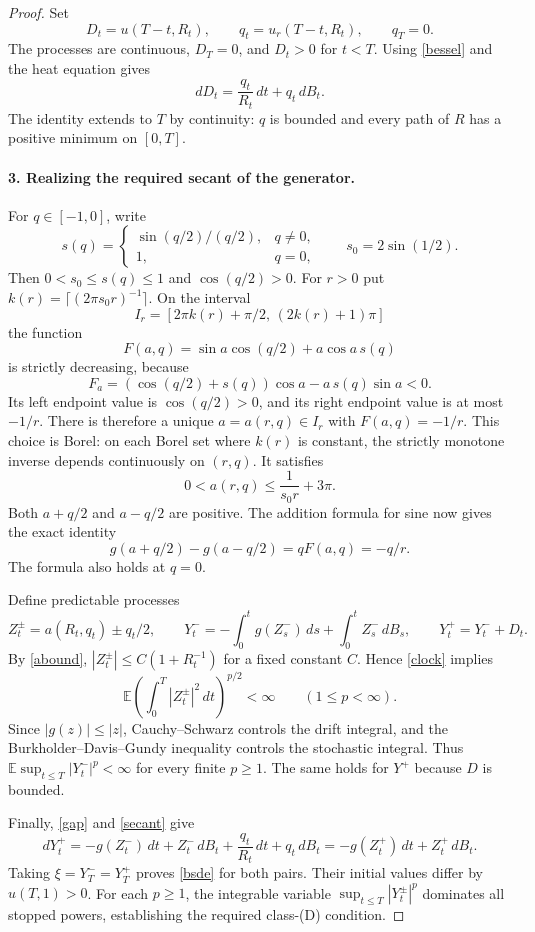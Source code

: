 \documentclass[11pt]{article}
\newcommand{\E}{\mathbb E}
\begin{document}
\begin{proof}
Set
\[
 D_t=u(T-t,R_t),\qquad q_t=u_r(T-t,R_t),
 \qquad q_T=0.
\]
The processes are continuous, $D_T=0$, and $D_t>0$ for $t<T$.
Using \eqref{bessel} and the heat equation gives
\begin{equation}\label{gap}
 dD_t=\frac{q_t}{R_t}\,dt+q_t\,dB_t.
\end{equation}
The identity extends to $T$ by continuity: $q$ is bounded and every
path of $R$ has a positive minimum on $[0,T]$.

\paragraph{3. Realizing the required secant of the generator.}
For $q\in[-1,0]$, write
\[
 s(q)=\begin{cases}\sin(q/2)/(q/2),&q\ne0,\\1,&q=0,\end{cases}
 \qquad s_0=2\sin(1/2).
\]
Then $0<s_0\le s(q)\le1$ and $\cos(q/2)>0$.
For $r>0$ put $k(r)=\lceil(2\pi s_0r)^{-1}\rceil$.
On the interval
\[
 I_r=[2\pi k(r)+\pi/2,\,(2k(r)+1)\pi]
\]
the function
\[
 F(a,q)=\sin a\cos(q/2)+a\cos a\,s(q)
\]
is strictly decreasing, because
\[
 F_a=(\cos(q/2)+s(q))\cos a-a\,s(q)\sin a<0.
\]
Its left endpoint value is $\cos(q/2)>0$, and its right endpoint
value is at most $-1/r$. There is therefore a unique
$a=a(r,q)\in I_r$ with $F(a,q)=-1/r$. This choice is Borel:
on each Borel set where $k(r)$ is constant, the strictly monotone
inverse depends continuously on $(r,q)$. It satisfies
\begin{equation}\label{abound}
 0<a(r,q)\le \frac1{s_0r}+3\pi.
\end{equation}
Both $a+q/2$ and $a-q/2$ are positive. The addition formula for sine
now gives the exact identity
\begin{equation}\label{secant}
 g(a+q/2)-g(a-q/2)=qF(a,q)=-q/r.
\end{equation}
The formula also holds at $q=0$.

Define predictable processes
\[
 Z_t^\pm=a(R_t,q_t)\pm q_t/2,
 \qquad
 Y_t^-=-\int_0^t g(Z_s^-)\,ds+\int_0^t Z_s^-\,dB_s,
 \qquad Y_t^+=Y_t^-+D_t.
\]
By \eqref{abound}, $|Z_t^\pm|\le C(1+R_t^{-1})$ for a fixed
constant $C$. Hence \eqref{clock} implies
\[
 \E\left(\int_0^T|Z_t^\pm|^2\,dt\right)^{p/2}<\infty
 \qquad(1\le p<\infty).
\]
Since $|g(z)|\le|z|$, Cauchy--Schwarz controls the drift integral,
and the Burkholder--Davis--Gundy inequality controls the stochastic
integral. Thus $\E\sup_{t\le T}|Y_t^-|^p<\infty$ for every finite
$p\ge1$. The same holds for $Y^+$ because $D$ is bounded.

Finally, \eqref{gap} and \eqref{secant} give
\[
 dY_t^+=-g(Z_t^-)\,dt+Z_t^-\,dB_t
          +\frac{q_t}{R_t}\,dt+q_t\,dB_t
        =-g(Z_t^+)\,dt+Z_t^+\,dB_t.
\]
Taking $\xi=Y_T^-=Y_T^+$ proves \eqref{bsde} for both pairs.
Their initial values differ by $u(T,1)>0$. For each $p\ge1$, the
integrable variable $\sup_{t\le T}|Y_t^\pm|^p$ dominates all stopped
powers, establishing the required class-(D) condition.
\end{proof}
\end{document}
